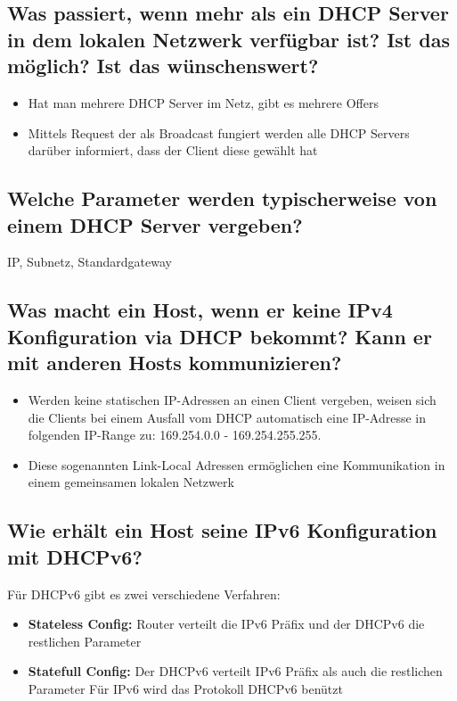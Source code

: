 \subsection*{Was passiert, wenn mehr als ein DHCP Server in dem lokalen Netzwerk verfügbar ist? Ist das möglich? Ist das wünschenswert?}
\begin{itemize}
    \item Hat man mehrere DHCP Server im Netz, gibt es mehrere Offers
    \item Mittels Request der als Broadcast fungiert werden alle DHCP Servers darüber informiert, dass der Client diese gewählt hat
\end{itemize}

\subsection*{Welche Parameter werden typischerweise von einem DHCP Server vergeben?}
IP, Subnetz, Standardgateway

\subsection*{Was macht ein Host, wenn er keine IPv4 Konfiguration via DHCP bekommt? Kann er mit anderen Hosts kommunizieren?}
\begin{itemize}
    \item Werden keine statischen IP-Adressen an einen Client vergeben, weisen sich die Clients bei einem Ausfall vom DHCP automatisch eine IP-Adresse in folgenden IP-Range zu: 169.254.0.0 - 169.254.255.255.
    \item Diese sogenannten Link-Local Adressen ermöglichen eine Kommunikation in einem gemeinsamen lokalen Netzwerk
\end{itemize}

\subsection*{Wie erhält ein Host seine IPv6 Konfiguration mit DHCPv6?}
Für DHCPv6 gibt es zwei verschiedene Verfahren:
\begin{itemize}
    \item \textbf{Stateless Config:} Router verteilt die IPv6 Präfix und der DHCPv6 die restlichen Parameter
    \item \textbf{Statefull Config:} Der DHCPv6 verteilt IPv6 Präfix als auch die restlichen Parameter Für IPv6 wird das Protokoll DHCPv6 benützt
\end{itemize}

